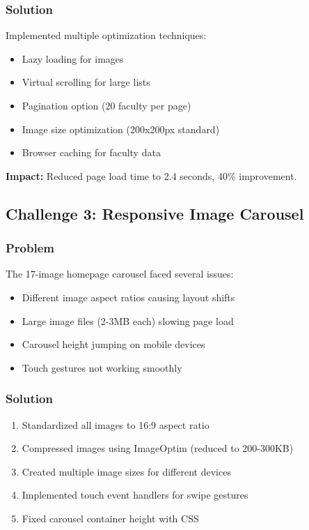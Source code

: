\documentclass[12pt,a4paper]{report}
\begin{document}
\subsubsection*{Solution}
Implemented multiple optimization techniques:
\begin{itemize}
    \item Lazy loading for images
    \item Virtual scrolling for large lists
    \item Pagination option (20 faculty per page)
    \item Image size optimization (200x200px standard)
    \item Browser caching for faculty data
\end{itemize}

\textbf{Impact:} Reduced page load time to 2.4 seconds, 40\% improvement.

\subsection{Challenge 3: Responsive Image Carousel}

\subsubsection*{Problem}
The 17-image homepage carousel faced several issues:
\begin{itemize}
    \item Different image aspect ratios causing layout shifts
    \item Large image files (2-3MB each) slowing page load
    \item Carousel height jumping on mobile devices
    \item Touch gestures not working smoothly
\end{itemize}

\subsubsection*{Solution}
\begin{enumerate}
    \item Standardized all images to 16:9 aspect ratio
    \item Compressed images using ImageOptim (reduced to 200-300KB)
    \item Created multiple image sizes for different devices
    \item Implemented touch event handlers for swipe gestures
    \item Fixed carousel container height with CSS
\end{enumerate}
\end{document}
